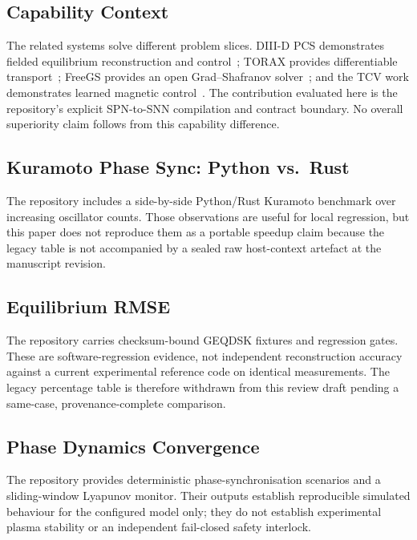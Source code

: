 \documentclass[twocolumn,preprintnumbers,amsmath,amssymb,prl,floatfix]{revtex4-2}
\begin{document}
\subsection{Capability Context}

The related systems solve different problem slices. DIII-D PCS
demonstrates fielded equilibrium reconstruction and control~\cite{ferron1998};
TORAX provides differentiable transport~\cite{fanni2024torax}; FreeGS provides
an open Grad--Shafranov solver~\cite{freegs}; and the TCV work demonstrates
learned magnetic control~\cite{degrave2022}. The contribution evaluated here is
the repository's explicit SPN-to-SNN compilation and contract boundary. No
overall superiority claim follows from this capability difference.

\subsection{Kuramoto Phase Sync: Python vs.\ Rust}

The repository includes a side-by-side Python/Rust Kuramoto benchmark over
increasing oscillator counts. Those observations are useful for local
regression, but this paper does not reproduce them as a portable speedup claim
because the legacy table is not accompanied by a sealed raw host-context
artefact at the manuscript revision.

\subsection{Equilibrium RMSE}

The repository carries checksum-bound GEQDSK fixtures and regression gates.
These are software-regression evidence, not independent reconstruction accuracy
against a current experimental reference code on identical measurements. The
legacy percentage table is therefore withdrawn from this review draft pending a
same-case, provenance-complete comparison.

\subsection{Phase Dynamics Convergence}

The repository provides deterministic phase-synchronisation scenarios and a
sliding-window Lyapunov monitor. Their outputs establish reproducible simulated
behaviour for the configured model only; they do not establish experimental
plasma stability or an independent fail-closed safety interlock.
\end{document}
